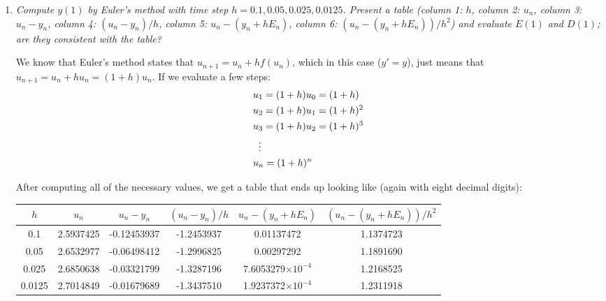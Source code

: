 \begin{enumerate}[label=(\alph*)]
      Integrating and using $D(0)=0$, we get that:
      \begin{equation*}
        D(t)e^{-t} = -\frac{1}{6}t \;\Rightarrow\; \boxed{D(t) = -\frac{1}{6}te^{t}.}
      \end{equation*}

    \item \textit{Compute $y(1)$ by Euler's method with time step $h=0.1, 0.05, 0.025, 0.0125$. Present a table (column 1: $h$, column 2: $u_{n}$, column 3: $u_{n}-y_{n}$, column 4: $(u_{n} - y_{n})/h$, column 5: $u_{n} - (y_{n}+hE_{n})$, column 6: $(u_{n} - (y_{n}+hE_{n}))/h^2$) and evaluate $E(1)$ and $D(1)$; are they consistent with the table?}
      \vspace{1em}

      We know that Euler's method states that $u_{n+1} = u_{n}+hf(u_{n})$, which in this case ($y'=y$), just means that $u_{n+1} = u_{n}+hu_{n}=(1+h)u_{n}$. If we evaluate a few steps:
      \begin{align*}
          &u_{1} = (1+h)u_{0}=(1+h) \\
          &u_{2} = (1+h)u_{1} = (1+h)^{2} \\
          &u_{3} = (1+h)u_{2} = (1+h)^{3} \\
          &\;\;\vdots \notag \\
          &u_{n} = (1+h)^{n}
      \end{align*}

      After computing all of the necessary values, we get a table that ends up looking like (again with eight decimal digits):
      \begin{table}[h!]
      \centering
      \begin{tabular}{|c|c|c|c|c|c|}
        \hline
        \rule{0pt}{3ex}$h$ & $u_{n}$ & $u_{n}-y_{n}$ & $(u_{n}-y_{n})/h$ & $u_{n} - (y_{n}+hE_{n})$ & $(u_{n} - (y_{n}+hE_{n}))/h^2$ \\
        \hline
        0.1    & 2.5937425 & -0.12453937 & -1.2453937 & 0.01137472
               & 1.1374723 \\
        0.05   & 2.6532977 & -0.06498412 & -1.2996825 & 0.00297292
               & 1.1891690 \\
        0.025  & 2.6850638 & -0.03321799 & -1.3287196 & 7.6053279$\times 10^{-4}$
               & 1.2168525 \\
        0.0125 & 2.7014849 & -0.01679689 & -1.3437510 & 1.9237372$\times 10^{-4}$
               & 1.2311918 \\
        \hline
      \end{tabular}
    \end{table}


\end{enumerate}
